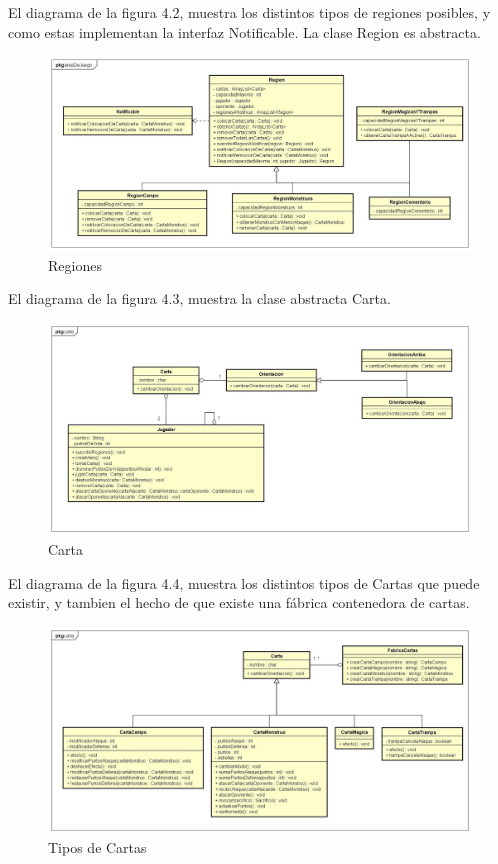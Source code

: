 El diagrama de la figura 4.2, muestra los distintos tipos de regiones posibles, y como estas implementan la interfaz Notificable. La clase Region es abstracta.

\begin{figure}[H]
	\centering
	\includegraphics[scale=0.3]{includes/areaDeJuego}
	\caption{Regiones}
	\label{areaDeJuego}
\end{figure}

El diagrama de la figura 4.3, muestra la clase abstracta Carta.

\begin{figure}[H]
	\centering
	\includegraphics[scale=0.3]{includes/Carta}
	\caption{Carta}
	\label{Cartas}
\end{figure}

El diagrama de la figura 4.4, muestra los distintos tipos de Cartas que puede existir, y tambien el hecho de que existe una fábrica contenedora de cartas.

\begin{figure}[H]
	\centering
	\includegraphics[scale=0.3]{includes/Carta2}
	\caption{Tipos de Cartas}
	\label{TiposCarta}
\end{figure}

